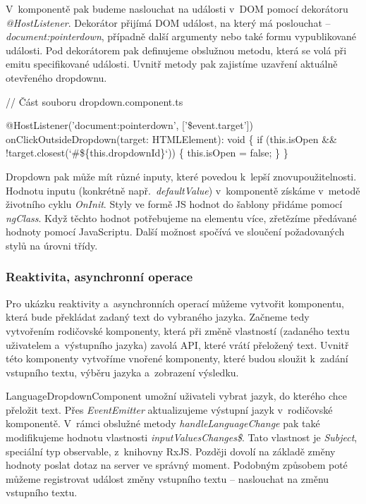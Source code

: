 V~komponentě pak budeme naslouchat na události v~DOM pomocí dekorátoru \emph{@HostListener}. 
Dekorátor přijímá DOM událost, na který má poslouchat -- \emph{document:pointerdown}, případně další argumenty nebo také formu vypublikované události. 
Pod dekorátorem pak definujeme obslužnou metodu, která se volá při emitu specifikované události. Uvnitř metody pak zajistíme uzavření aktuálně otevřeného dropdownu.

\begin{prog}
// Část souboru dropdown.component.ts

@HostListener('document:pointerdown', ['\$event.target'])
onClickOutsideDropdown(target: HTMLElement): void \{
  if (this.isOpen && !target.closest(`#\$\{this.dropdownId\}`)) \{
    this.isOpen = false;
  \}
\}
\end{prog}

Dropdown pak může mít různé inputy, které povedou k~lepší znovupoužitelnosti. Hodnotu inputu (konkrétně např.~\emph{defaultValue}) v~komponentě získáme v~metodě životního cyklu \emph{OnInit}. 
Styly ve formě JS hodnot do šablony přidáme pomocí \emph{ngClass}. Když těchto hodnot potřebujeme na elementu více, zřetězíme předávané hodnoty pomocí JavaScriptu. 
Další možnost spočívá ve sloučení požadovaných stylů na úrovni třídy.

\subsubsection*{Reaktivita, asynchronní operace}

Pro ukázku reaktivity a~asynchronních operací můžeme vytvořit komponentu, která bude překládat zadaný text do vybraného jazyka. 
Začneme tedy vytvořením rodičovské komponenty, která při změně vlastností (zadaného textu uživatelem a~výstupního jazyka) zavolá API, které vrátí přeložený text. 
Uvnitř této komponenty vytvoříme vnořené komponenty, které budou sloužit k~zadání vstupního textu, výběru jazyka a~zobrazení výsledku. 

LanguageDropdownComponent umožní uživateli vybrat jazyk, do kterého chce přeložit text. 
Přes \emph{EventEmitter} aktualizujeme výstupní jazyk v~rodičovské komponentě. V~rámci obslužné metody \emph{handleLanguageChange} pak také modifikujeme hodnotu vlastnosti \emph{inputValuesChanges\$}.
Tato vlastnost je \emph{Subject}, speciální typ observable, z~knihovny RxJS. Později dovolí na základě změny hodnoty poslat dotaz na server ve správný moment. 
Podobným způsobem poté můžeme registrovat událost změny vstupního textu -- naslouchat na změnu vstupního textu.

